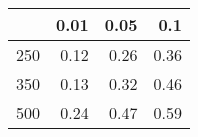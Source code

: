 % 
\begin{tabular}{rrrr}
  \hline
 & 0.01 & 0.05 & 0.1 \\ 
  \hline
250 & 0.12 & 0.26 & 0.36 \\ 
  350 & 0.13 & 0.32 & 0.46 \\ 
  500 & 0.24 & 0.47 & 0.59 \\ 
   \hline
\end{tabular}
